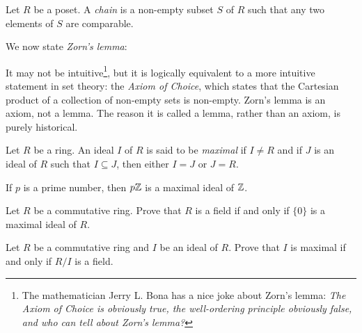 \begin{definition}
    Let $R$ be a poset. A \emph{chain} is a non-empty subset $S$ of $R$ such that
    any two elements of $S$ are comparable. 
\end{definition}

We now state \emph{Zorn's lemma}:

\begin{quote}
\end{quote}


It may not be intuitive\footnote{The mathematician
Jerry L. Bona has a nice joke about Zorn's lemma: 
\textit{The Axiom of Choice is obviously true, 
the well-ordering principle obviously false, and who can tell about Zorn's lemma?}}, but it is logically equivalent to a more intuitive statement in set theory: the \emph{Axiom of Choice}, which states that the Cartesian product of a collection of non-empty sets is non-empty. Zorn's lemma is an axiom, not a lemma. The reason it is called a lemma, rather than an axiom, is purely historical.

\begin{definition}
	Let $R$ be a ring. An ideal $I$ of $R$ is said to be \emph{maximal}
	if $I\ne R$ and if $J$ is an ideal of $R$ such that $I\subseteq J$, then 
	either $I=J$ or $J=R$. 
\end{definition}

If $p$ is a prime number, then $p\mathbb{Z}$ is a maximal ideal of $\mathbb{Z}$.

\begin{exercise}
Let $R$ be a commutative ring. Prove that $R$ is a 
field if and only if $\{0\}$ is a maximal ideal of $R$. 	
\end{exercise}

\begin{exercise}
\label{xca:maximal<=>field}
Let $R$ be a commutative ring and $I$ be an ideal of $R$. Prove that $I$ is maximal
if and only if $R/I$ is a field.  	
\end{exercise}

